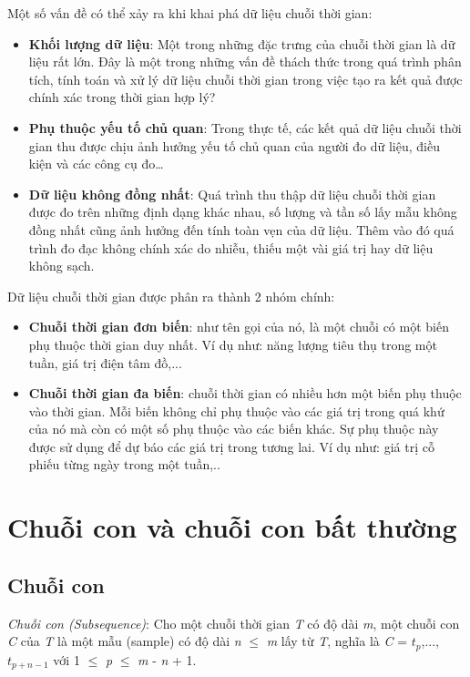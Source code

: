 Một số vấn đề có thể xảy ra khi khai phá dữ liệu chuỗi thời gian:
\begin{itemize}
    \item  \textbf{Khối lượng dữ liệu}: Một trong những đặc trưng của chuỗi thời gian là dữ liệu rất lớn. Đây là một trong những vấn đề thách thức trong quá trình phân tích, tính toán và xử lý dữ liệu chuỗi thời gian trong việc tạo ra kết quả được chính xác trong thời gian hợp lý?
    \item \textbf{Phụ thuộc yếu tố chủ quan}: Trong thực tế, các kết quả dữ liệu chuỗi thời gian thu được chịu ảnh hưởng yếu tố chủ quan của người đo dữ liệu, điều kiện và các công cụ đo…
    \item \textbf{Dữ liệu không đồng nhất}: Quá trình thu thập dữ liệu chuỗi thời gian được đo trên những định dạng khác nhau, số lượng và tần số lấy mẫu không đồng nhất cũng ảnh hưởng đến tính toàn vẹn của dữ liệu. Thêm vào đó quá trình đo đạc không chính xác do nhiễu, thiếu một vài giá trị hay dữ liệu không sạch.
\end{itemize}

Dữ liệu chuỗi thời gian được phân ra thành 2 nhóm chính:
\begin{itemize}
\item \textbf{Chuỗi thời gian đơn biến}: như tên gọi của nó, là một chuỗi có một biến phụ thuộc thời gian duy nhất. Ví dụ như: năng lượng tiêu thụ trong một tuần, giá trị điện tâm đồ,... 
\item \textbf{Chuỗi thời gian đa biến}: chuỗi thời gian có nhiều hơn một biến phụ thuộc vào thời gian. Mỗi biến không chỉ phụ thuộc vào các giá trị trong quá khứ của nó mà còn có một số phụ thuộc vào các biến khác. Sự phụ thuộc này được sử dụng để dự báo các giá trị trong tương lai. Ví dụ như: giá trị cỗ phiếu từng ngày trong một tuần,..
\end{itemize}

\section{Chuỗi con và chuỗi con bất thường}
\subsection{Chuỗi con}
\textit{Chuỗi con (Subsequence)}: Cho một chuỗi thời gian \textit{T} có độ dài \textit{m}, một chuỗi con \textit{C} của \textit{T} là một mẫu (sample) có độ dài \textit{n} $\leq$ \textit{m} lấy từ \textit{T}, nghĩa là \textit{C} = $t_p$,...,$t_{p+n-1}$ với 1 $\leq$ \textit{p} $\leq$ \textit{m} - \textit{n} + 1.

